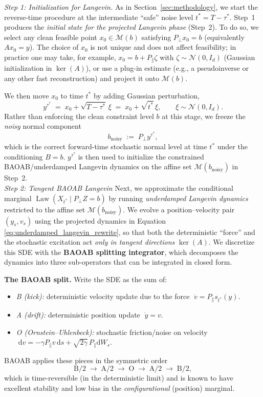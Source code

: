\documentclass[twoside,11pt]{article}
\newcommand{\Nc}{\mathcal{N}}
\newcommand{\dd}{\mathrm{d}}
\newcommand{\Mc}{\mathcal{M}}
\newcommand{\Law}{\operatorname{Law}}
\numberwithin{equation}{section}
\begin{document}
\emph{Step 1: Initialization for Langevin.}
As in Section~\ref{sec:methodology}, we start the reverse-time procedure at the intermediate ``safe'' noise level
\(t^*=T-\tau^*\). Step~1 produces the \emph{initial state for the projected Langevin phase} (Step~2).
To do so, we select any clean feasible point \(x_0\in\Mc(b)\) satisfying \(P_\perp x_0=b\) (equivalently \(Ax_0=y\)).
The choice of \(x_0\) is not unique and does not affect feasibility; in practice one may take, for example,
\(x_0=b+P_\parallel \zeta\) with \(\zeta\sim\Nc(0,I_d)\) (Gaussian initialization in \(\ker(A)\)), or use a plug-in
estimate (e.g., a pseudoinverse or any other fast reconstruction) and project it onto \(\Mc(b)\).

We then move \(x_0\) to time \(t^*\) by adding Gaussian perturbation,
\[
y^{\tau^*} \;=\; x_0 + \sqrt{T-\tau^*}\,\xi \;=\; x_0+\sqrt{t^*}\,\xi,
\qquad \xi\sim\Nc(0,I_d).
\]
Rather than enforcing the clean constraint level \(b\) at this stage, we freeze the \emph{noisy} normal component
\[
b_{\mathrm{noisy}} \;:=\; P_\perp y^{\tau^*},
\]
which is the correct forward-time stochastic normal level at time \(t^*\) under the conditioning \(B=b\).
\(y^{\tau^*}\) is then used to initialize the constrained BAOAB/underdamped Langevin
dynamics on the affine set \(\Mc(b_{\mathrm{noisy}})\) in Step~2.\\
\emph{Step 2: Tangent BAOAB Langevin}
Next, we approximate the conditional marginal \(\Law(X_{t^*}\mid P_{\perp}Z =b)\) by running \emph{underdamped Langevin dynamics}
restricted to the affine set $\Mc(b_{\text{noisy}})$.
We evolve a position--velocity pair \((y_s,v_s)\) using the projected dynamics in Equation \eqref{eq:underdamped_langevin_rewrite}, 
so that both the deterministic ``force'' and the stochastic excitation act \emph{only in tangent directions}
\(\ker(A)\). We discretize this SDE with the \textbf{BAOAB splitting integrator}, which decomposes the dynamics into
three sub-operators that can be integrated in closed form.

\smallskip
\noindent\textbf{The BAOAB split.}
Write the SDE as the sum of:
\begin{itemize}
  \item \emph{B (kick):} deterministic velocity update due to the force
  \(\;\dot v = P_{\parallel}s_{t^*}(y)\).
  \item \emph{A (drift):} deterministic position update
  \(\;\dot y = v\).
  \item \emph{O (Ornstein--Uhlenbeck):} stochastic friction/noise on velocity
  \(\;\dd v = -\gamma P_{\parallel}v\,\dd s + \sqrt{2\gamma}\,P_{\parallel}\dd W_s\).
\end{itemize}
BAOAB applies these pieces in the symmetric order
\[
\text{B/2} \;\rightarrow\; \text{A/2} \;\rightarrow\; \text{O} \;\rightarrow\; \text{A/2} \;\rightarrow\; \text{B/2},
\]
which is time-reversible (in the deterministic limit) and is known to have excellent stability and low bias in the
\emph{configurational} (position) marginal.
\end{document}
